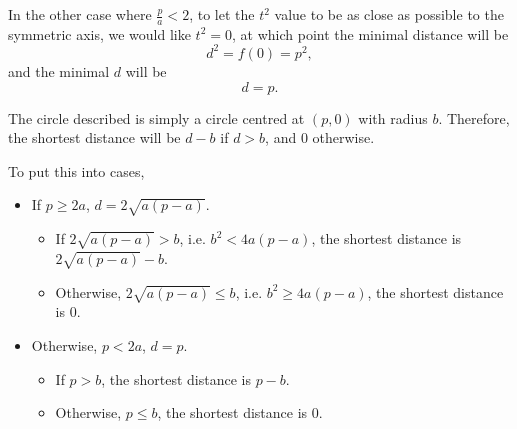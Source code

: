 \begin{enumerate}
          In the other case where \(\frac{p}{a} < 2\), to let the \(t^2\) value to be as close as possible to the symmetric axis, we would like \(t^2 = 0\), at which point the minimal distance will be
          \[
              d^2 = f(0) = p^2,
          \]
          and the minimal \(d\) will be
          \[
              d = p.
          \]

          The circle described is simply a circle centred at \((p, 0)\) with radius \(b\). Therefore, the shortest distance will be \(d - b\) if \(d > b\), and \(0\) otherwise.

          To put this into cases,
          \begin{itemize}
              \item If \(p \geq 2a\), \(d = 2\sqrt{a(p - a)}\).
                    \begin{itemize}
                        \item If \(2\sqrt{a(p - a)} > b\), i.e. \(b^2 < 4a(p - a)\), the shortest distance is \(2\sqrt{a(p - a)} - b\).
                        \item Otherwise, \(2\sqrt{a(p - a)} \leq b\), i.e. \(b^2 \geq 4a(p - a)\), the shortest distance is \(0\).
                    \end{itemize}
              \item Otherwise, \(p < 2a\), \(d = p\).
                    \begin{itemize}
                        \item If \(p > b\), the shortest distance is \(p - b\).
                        \item Otherwise, \(p \leq b\), the shortest distance is \(0\).
                    \end{itemize}
          \end{itemize}

\end{enumerate}